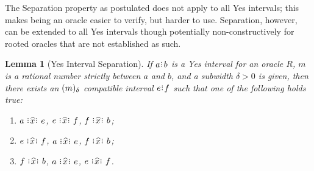 \documentclass[12pt]{article}
\newtheorem{lemma}{Lemma}[section]
\begin{document}
The Separation property as postulated does not apply to all Yes intervals; this makes being an oracle easier to verify, but harder to use. Separation, however, can be extended to all Yes intervals though potentially non-constructively for rooted oracles that are not established as such.

\begin{lemma}[Yes Interval Separation]
    If $a\rint  b$ is a Yes interval for an oracle $R$, $m$ is a rational number strictly between $a$ and $b$, and a subwidth $\delta > 0$ is given, then there exists an $(m)_{\delta}$ compatible interval $e\rint f$ such that one of the following holds true: 
    \begin{enumerate}
        \item $a \xora e$, \sout{$e\xora f$}, \sout{$f\xora b$};
        \item $e \xora f$, \sout{$a\xora e$}, \sout{$f\xora b$};
        \item $f \xora b$, \sout{$a\xora e$}, \sout{$e\xora f$}.
    \end{enumerate}
\end{lemma}
\end{document}
